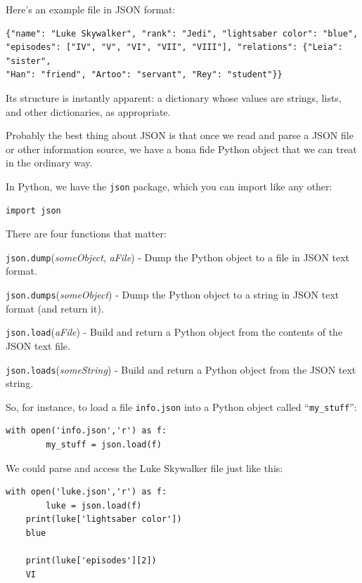 Here's an example file in JSON format:

\small
\begin{Verbatim}[fontsize=\small,samepage=true,frame=none]
{"name": "Luke Skywalker", "rank": "Jedi", "lightsaber color": "blue",
"episodes": ["IV", "V", "VI", "VII", "VIII"], "relations": {"Leia": "sister",
"Han": "friend", "Artoo": "servant", "Rey": "student"}}
\end{Verbatim}
\normalsize

Its structure is instantly apparent: a dictionary whose values are strings,
lists, and other dictionaries, as appropriate.

Probably the best thing about JSON is that once we read and parse a JSON file
or other information source, we have a bona fide Python object that we can
treat in the ordinary way.

In Python, we have the \texttt{json} package, which you can import like any
other:

\begin{Verbatim}[fontsize=\small,samepage=true,frame=single]
    import json
\end{Verbatim}

There are four functions that matter:
\small
\begin{compactitem}
\item \texttt{json.dump}(\textit{someObject}, \textit{aFile}) - Dump the Python
object to a file in JSON text format.
\item \texttt{json.dumps}(\textit{someObject}) - Dump the Python
object to a string in JSON text format (and return it).
\item \texttt{json.load}(\textit{aFile}) - Build and return a Python
object from the contents of the JSON text file.
\item \texttt{json.loads}(\textit{someString}) - Build and return a Python object
from the JSON text string.
\end{compactitem}

\normalsize
So, for instance, to load a file \texttt{info.json} into a Python object
called ``\texttt{my\_stuff}'':

\small
\begin{Verbatim}[fontsize=\small,samepage=true,frame=single]
    with open('info.json','r') as f:
        my_stuff = json.load(f)
\end{Verbatim}

\normalsize
We could parse and access the Luke Skywalker file just like this:

\small
\begin{Verbatim}[fontsize=\small,samepage=true,frame=single]
    with open('luke.json','r') as f:
        luke = json.load(f)
    print(luke['lightsaber color'])
    blue

    print(luke['episodes'][2])
    VI
\end{Verbatim}


